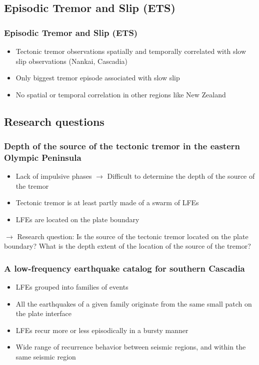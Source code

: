 \documentclass{beamer}
\begin{document}
	\subsection{Episodic Tremor and Slip (ETS)}

	\begin{frame}
		\frametitle{Episodic Tremor and Slip (ETS)}
		\begin{itemize}
			\item Tectonic tremor observations spatially and temporally correlated with slow slip observations (Nankai, Cascadia)
			\item Only biggest tremor episode associated with slow slip
			\item No spatial or temporal correlation in other regions like New Zealand
		\end{itemize}
	\end{frame}

	
	\subsection{Research questions}

	\begin{frame}
		\frametitle{Depth of the source of the tectonic tremor in the eastern Olympic Peninsula}
		\begin{itemize}
			\item Lack of impulsive phases $\rightarrow$ Difficult to determine the depth of the source of the tremor
			\item Tectonic tremor is at least partly made of a swarm of LFEs
			\item LFEs are located on the plate boundary
		\end{itemize}

		\begin{block}{}
			$\rightarrow$ Research question: Is the source of the tectonic tremor located on the plate boundary? What is the depth extent of the location of the source of the tremor?
		\end{block}
	\end{frame}

	\begin{frame}
		\frametitle{A low-frequency earthquake catalog for southern Cascadia}
		\begin{itemize}
			\item LFEs grouped into families of events
			\item All the earthquakes of a given family originate from the same small patch on the plate interface
			\item LFEs recur more or less episodically in a bursty manner
			\item Wide range of recurrence behavior between seismic regions, and within the same seismic region
		\end{itemize}
	\end{frame}
\end{document}
